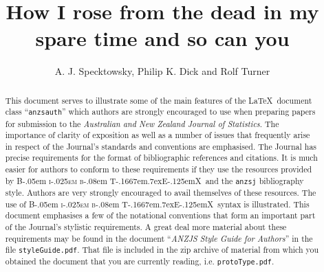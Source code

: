 \documentclass[times, doublespace]{anzsauth}
\newcommand\BibTeX{{\rmfamily B\kern-.05em \textsc{i\kern-.025em b}\kern-.08em
T\kern-.1667em\lower.7ex\hbox{E}\kern-.125emX}}
\begin{document}
\cleanlookdateon
\title{How I rose from the dead in my spare time and so can you}
\author{A. J. Specktowsky, Philip K. Dick and
Rolf Turner\corrauth}
\address{
 \hspace*{-2ex} Department of Redundancy Department,
School of Hard Knocks, Great Falls, MT 54321, USA\break
{} Complaints Division, 30102 East Rhode Island
School of Design Terrace, Small Planet, Near Betelgeuse\break
{} Department of Statistics, University of Auckland,
Private Bag 92019, Auckland 1142, New Zealand\\
\hspace*{1ex} Email: \texttt{r.turner@auckland.ac.nz}
}
\begin{abstract}
This document serves to illustrate some of the main features of
the \LaTeX\ document class ``\texttt{anzsauth}'' which authors are
strongly encouraged to use when preparing papers for submission
to the \textit{Australian and New Zealand Journal of Statistics}.
The importance of clarity of exposition as well as a number of
issues that frequently arise in respect of the Journal's standards
and conventions are emphasised.  The Journal has precise requirements
for the format of bibliographic references and citations.  It is much
easier for authors to conform to these requirements if they use the
resources provided by \BibTeX\ and the \texttt{anzsj} bibliography
style.  Authors are very strongly encouraged to avail themselves
of these resources.  The use of \BibTeX\ syntax is illustrated.
This document emphasises a few of the notational conventions that
form an important part of the Journal's stylistic requirements.
A great deal more material about these requirements may be found
in the document ``\textit{ANZJS Style Guide for Authors}'' in the
file \texttt{styleGuide.pdf}.  That file is included in the zip
archive of material from which you obtained the document that you
are currently reading, i.e. \texttt{protoType.pdf}.
\end{abstract}
\end{document}
